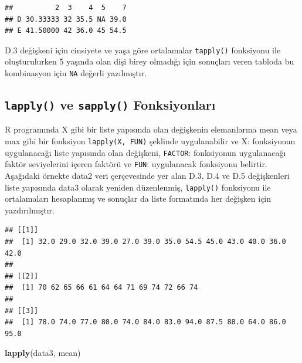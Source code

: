 \documentclass[
]{book}
\newenvironment{Shaded}{\begin{snugshade}}{\end{snugshade}}
\newcommand{\FloatTok}[1]{\textcolor[rgb]{0.00,0.00,0.81}{#1}}
\newcommand{\FunctionTok}[1]{\textcolor[rgb]{0.13,0.29,0.53}{\textbf{#1}}}
\newcommand{\NormalTok}[1]{#1}
\newcommand{\OtherTok}[1]{\textcolor[rgb]{0.56,0.35,0.01}{#1}}
\newcommand{\SpecialCharTok}[1]{\textcolor[rgb]{0.81,0.36,0.00}{\textbf{#1}}}
\begin{document}
\begin{verbatim}
##          2  3    4  5    7
## D 30.33333 32 35.5 NA 39.0
## E 41.50000 42 36.0 45 54.5
\end{verbatim}

D.3 değişkeni için cinsiyete ve yaşa göre ortalamalar \texttt{tapply()} fonksiyonu ile oluşturulurken 5 yaşında olan dişi birey olmadığı için sonuçları veren tabloda bu kombinasyon için \texttt{NA} değerli yazılmıştır.

\subsection{\texorpdfstring{\texttt{lapply()} ve \texttt{sapply()} Fonksiyonları}{lapply() ve sapply() Fonksiyonları}}\label{lapply-ve-sapply-fonksiyonlarux131}

R programında X gibi bir liste yapısında olan değişkenin elemanlarına mean veya max gibi bir fonksiyon \texttt{lapply(X,\ FUN)} şeklinde uygulanabilir ve X: fonksiyonun uygulanacağı liste yapısında olan değişkeni, \texttt{FACTOR}: fonksiyonun uygulanacağı faktör seviyelerini içeren faktörü ve \texttt{FUN}: uygulanacak fonksiyonu belirtir.
Aşağıdaki örnekte data2 veri çerçevesinde yer alan D.3, D.4 ve D.5 değişkenleri liste yapısında data3 olarak yeniden düzenlenmiş, \texttt{lapply()} fonksiyonu ile ortalamaları hesaplanmış ve sonuçlar da liste formatında her değişken için yazdırılmıştır.

\begin{Shaded}
\end{Shaded}

\begin{verbatim}
## [[1]]
##  [1] 32.0 29.0 32.0 39.0 27.0 39.0 35.0 54.5 45.0 43.0 40.0 36.0 42.0
## 
## [[2]]
##  [1] 70 62 65 66 61 64 64 71 69 74 72 66 74
## 
## [[3]]
##  [1] 78.0 74.0 77.0 80.0 74.0 84.0 83.0 94.0 87.5 88.0 64.0 86.0 95.0
\end{verbatim}

\begin{Shaded}
\begin{Highlighting}[]
\FunctionTok{lapply}\NormalTok{(data3, mean)}
\end{Highlighting}
\end{Shaded}
\end{document}
